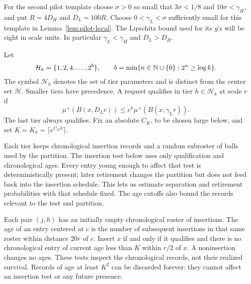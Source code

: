 For the second pilot template choose \(\sigma>0\) so small that
\(3\sigma<1/8\) and \(10\sigma<\gamma_H\), and put \(R=4D_H\) and
\(D_L=100R\).  Choose \(0<\gamma_L<\sigma\) sufficiently small for
this template in Lemma~\ref{lem:pilot-local}.  The Lipschitz bound used
for its \(g\)'s will be eight in scale units.  In particular
\(\gamma_L<\gamma_H\) and \(D_L>D_H\).

Let
\[
 \mathcal H_k=\{1,2,4,\ldots,2^b\},\qquad
 b=\min\{n\in\mathbb N\cup\{0\}:2^n\ge\log k\}.
\]
The symbol \(\mathcal H_k\) denotes the set of tier parameters and is
distinct from the center set \(\mathcal H\).  Smaller tiers have
precedence.  A request qualifies in tier \(h\in\mathcal H_k\) at scale
\(r\) if
\begin{equation}\label{eq:tier-qualification}
 \mu^+(B(x,D_Lr))\le e^h\mu^+(B(x,\gamma_Lr)).
\end{equation}
The last tier always qualifies.  Fix an absolute \(C_K\), to be chosen
large below, and set \(K=K_h=\lceil e^{C_Kh}\rceil\).

Each tier keeps chronological insertion records and a random subroster
of balls used by the partition.  The insertion test below uses only
qualification and chronological ages.  Every entry young enough to
affect that test is deterministically present; later retirement changes
the partition but does not feed back into the insertion schedule.
This lets us estimate separation and retirement probabilities with that
schedule fixed.  The age cutoffs also bound the records relevant to the
test and partition.

Each pair \((j,h)\) has an initially empty chronological roster of
insertions.  The age of an entry centered at \(c\) is the number of
subsequent insertions in that same roster within distance \(20r\) of
\(c\).  Insert \(x\) if and only if it qualifies and there is no
chronological entry of current age less than \(K\) within \(r/2\) of
\(x\).  A noninsertion changes no ages.  These tests inspect the
chronological records, not their realized survival.  Records of age at
least \(K^2\) can be discarded forever: they cannot affect an insertion
test or any future presence.

